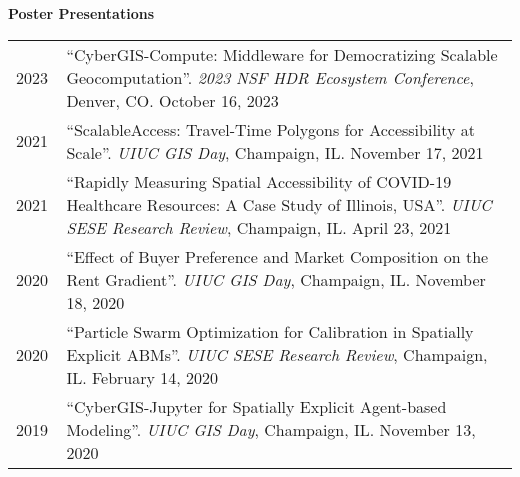\documentclass{acmcv}
\begin{document}
    \textbf{Poster Presentations}
    \vspace*{-0.3cm}

    \begin{longtable}{p{0.1\linewidth} p{0.9\linewidth}}
        2023 & ``CyberGIS-Compute: Middleware for Democratizing Scalable Geocomputation''. \textit{2023 NSF HDR Ecosystem Conference}, Denver, CO. October 16, 2023 \\

        2021 & ``ScalableAccess: Travel-Time Polygons for Accessibility at Scale''. \textit{UIUC GIS Day}, Champaign, IL. November 17, 2021 \\

        2021 & ``Rapidly Measuring Spatial Accessibility of COVID-19 Healthcare Resources: A Case Study of Illinois, USA''. \textit{UIUC SESE Research Review}, Champaign, IL. April 23, 2021 \\ 

        2020 & ``Effect of Buyer Preference and Market Composition on the Rent Gradient''. \textit{UIUC GIS Day}, Champaign, IL. November 18, 2020 \\

        2020 & ``Particle Swarm Optimization for Calibration in Spatially Explicit ABMs''. \textit{UIUC SESE Research Review}, Champaign, IL. February 14, 2020 \\ 

        2019 & ``CyberGIS-Jupyter for Spatially Explicit Agent-based Modeling''. \textit{UIUC GIS Day}, Champaign, IL. November 13, 2020 \\

    \end{longtable}



\end{document}
